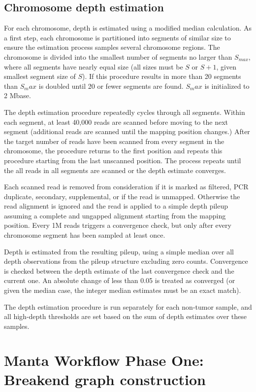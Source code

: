 \documentclass{article}
\begin{document}
\subsection{Chromosome depth estimation}

For each chromosome, depth is estimated using a modified median calculation. As a first step, each chromosome is partitioned into segments of similar size to ensure the estimation process samples several chromosome regions. The chromosome is divided into the smallest number of segments no larger than $S_{max}$, where all segments have nearly equal size (all sizes must be $S$ or $S+1$, given smallest segment size of $S$). If this procedure results in more than 20 segments than $S_max$ is doubled until 20 or fewer segments are found. $S_max$ is initialized to 2 Mbase.

The depth estimation procedure repeatedly cycles through all segments. Within each segment, at least 40,000 reads are scanned before moving to the next segment (additional reads are scanned until the mapping position changes.) After the target number of reads have been scanned from every segment in the chromosome, the procedure returns to the first position and repeats this procedure starting from the last unscanned position. The process repeats until the all reads in all segments are scanned or the depth estimate converges.

Each scanned read is removed from consideration if it is marked as filtered, PCR duplicate, secondary, supplemental, or if the read is unmapped. Otherwise the read alignment is ignored and the read is applied to a simple depth pileup assuming a complete and ungapped alignment starting from the mapping position. Every 1M reads triggers a convergence check, but only after every chromosome segment has been sampled at least once.

Depth is estimated from the resulting pileup, using a simple median over all depth observations from the pileup structure excluding zero counts. Convergence is checked between the depth estimate of the last convergence check and the current one. An absolute change of less than 0.05 is treated as converged (or given the median case, the integer median estimates must be an exact match).

The depth estimation procedure is run separately for each non-tumor sample, and all high-depth thresholds are set based on the sum of depth estimates over these samples.

\section{Manta Workflow Phase One: Breakend graph construction}
\end{document}

